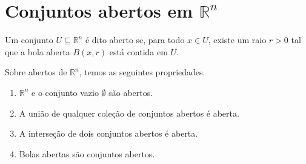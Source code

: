
\section{Conjuntos abertos em $\mathbb R^n$}
\begin{definition}
    Um conjunto $U \subseteq \mathbb R^n$ é dito aberto se, para todo $x \in U$, existe um raio $r > 0$ tal que a bola aberta $B(x, r)$ está contida em $U$.
\end{definition}
\begin{proposition}
    Sobre abertos de $\mathbb R^n$, temos as seguintes propriedades.
    \begin{enumerate}
        \item $\mathbb R^n$ e o conjunto vazio $\emptyset$ são abertos.
        \item A união de qualquer coleção de conjuntos abertos é aberta.
        \item A interseção de dois conjuntos abertos é aberta.
        \item Bolas abertas são conjuntos abertos.
    \end{enumerate}
\end{proposition}
